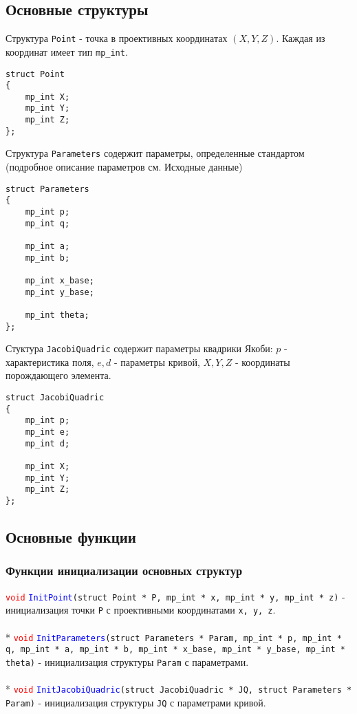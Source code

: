 \documentclass[12pt]{article}
\begin{document}
\subsection{Основные структуры}
Структура \texttt{Point} - точка в проективных координатах $(X, Y, Z)$. Каждая из координат имеет тип \texttt{mp\_int}.
\lstset{language=C}
\begin{lstlisting} 
struct Point
{
    mp_int X;
    mp_int Y;
    mp_int Z;
};
\end{lstlisting}
Структура \texttt{Parameters} содержит параметры, определенные стандартом (подробное описание параметров см. Исходные данные)
\lstset{language=C}
\begin{lstlisting} 
struct Parameters
{
    mp_int p;
    mp_int q;

    mp_int a;
    mp_int b;

    mp_int x_base;
    mp_int y_base;

    mp_int theta;
};
\end{lstlisting}
Стуктура \texttt{JacobiQuadric} содержит параметры квадрики Якоби: $p$ - характеристика поля, $e, d$ - параметры кривой, $X, Y, Z$ - координаты порождающего элемента.
\lstset{language=C}
\begin{lstlisting} 
struct JacobiQuadric
{
    mp_int p;
    mp_int e;
    mp_int d;

    mp_int X;
    mp_int Y;
    mp_int Z;
};
\end{lstlisting} 
\subsection{Основные функции}
\subsubsection{Функции инициализации основных структур}
\textcolor{red}{\texttt{void}} \textcolor{blue}{\texttt{InitPoint}}\texttt{(struct Point * P, mp\_int * x, mp\_int * y, mp\_int * z)} - инициализация точки \texttt{P} с проективными координатами \texttt{x, y, z}.\\
\\*
\textcolor{red}{\texttt{void}} \textcolor{blue}{\texttt{InitParameters}}\texttt{(struct Parameters * Param, mp\_int * p, mp\_int * q, mp\_int * a, mp\_int * b, mp\_int * x\_base, mp\_int * y\_base, mp\_int * theta)} - инициализация структуры \texttt{Param} с параметрами.\\
\\*
\textcolor{red}{\texttt{void}} \textcolor{blue}{\texttt{InitJacobiQuadric}}\texttt{(struct JacobiQuadric * JQ, struct Parameters * Param)} - инициализация структуры \texttt{JQ} с параметрами кривой.\\ 
\end{document}
